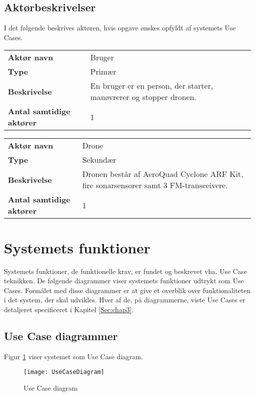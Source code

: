 \documentclass[Main]{subfiles}
\begin{document}
\subsection{Aktørbeskrivelser}
I det følgende beskrives aktøren, hvis opgave ønskes opfyldt af systemets Use Cases. 

\begin{longtable}{p{}|p{}}
\hline
\textbf{Aktør navn}  				& Bruger \\
\textbf{Type} 						& Primær \\
\textbf{Beskrivelse} 				& En bruger er en person, der starter, manøvrerer og stopper dronen. \\
\textbf{Antal samtidige aktører} 	& 1 \\
\hline
\end{longtable}

\begin{longtable}{p{}|p{}}
\hline
\textbf{Aktør navn}  				& Drone \\
\textbf{Type} 						& Sekundær \\
\textbf{Beskrivelse} 				& Dronen består af AeroQuad Cyclone ARF Kit, fire sonarsensorer samt 3 FM-transceivere. \\
\textbf{Antal samtidige aktører} 	& 1 \\
\hline
\end{longtable}


\section{Systemets funktioner}
Systemets funktioner, de funktionelle krav, er fundet og beskrevet vha. Use Case teknikken. 
De følgende diagrammer viser systemets funktioner udtrykt som Use Cases. 
Formålet med disse diagrammer er at give et overblik over funktionaliteten i det system, der skal udvikles. 
Hver af de, på diagrammerne, viste Use Cases er detaljeret specificeret i Kapitel \ref{Sec:chap3}.



\subsection{Use Case diagrammer}
Figur \ref{Fig:UC-Diagram} viser systemet som Use Case diagram.

\begin{figure}[hbtp]
\centering
\texttt{[image: UseCaseDiagram]}
\caption{Use Case diagram}
\label{Fig:UC-Diagram}
\end{figure}
\end{document}
